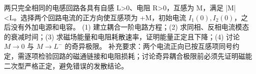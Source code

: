 两只完全相同的电感回路各具有自感 L>0、电阻 R>0，互感为 M，满足 |M|<L。选择两个回路电流的正方向使互感项为 +M，初始电流 \(I_{1}(0),I_{2}(0)\)，之后没有外加电源和电容。
(1) 建立耦合一阶电路方程；(2) 求同相、反相电流模态的衰减时间；(3) 求磁场能量和电阻耗散速率，证明能量正定且下降；(4) 讨论 \(M\to 0\) 与 \(M\to L^{-}\) 的奇异极限。
补充要求：两个电流正向已按互感项同号约定，需逐项检验回路的磁通链接和电阻损耗；讨论奇异耦合极限前必须先证明磁能二次型严格正定，避免错误的发散结论。
